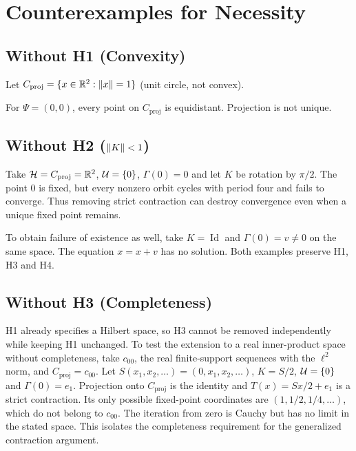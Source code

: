 ﻿%
\section{Counterexamples for Necessity}

\subsection{Without H1 (Convexity)}

Let ${C_{\mathrm{proj}}} = \{x \in \mathbb{R}^2 : \left\lVert x \right\rVert = 1\}$ (unit circle, not convex).

For $\Psi = (0, 0)$, every point on ${C_{\mathrm{proj}}}$ is equidistant. Projection is not unique.

\subsection{\texorpdfstring{Without H2 ($\left\lVert K \right\rVert < 1$)}{Without H2 (norm K < 1)}}

Take $\mathcal{H}={C_{\mathrm{proj}}}=\mathbb R^2$, $\mathcal{U}=\{0\}$, $\Gamma(0)=0$ and let $K$ be rotation by $\pi/2$. The point $0$ is fixed, but every nonzero orbit cycles with period four and fails to converge. Thus removing strict contraction can destroy convergence even when a unique fixed point remains.

To obtain failure of existence as well, take $K=\operatorname{Id}$ and $\Gamma(0)=v\neq0$ on the same space. The equation $x=x+v$ has no solution. Both examples preserve H1, H3 and H4.

\subsection{Without H3 (Completeness)}

H1 already specifies a Hilbert space, so H3 cannot be removed independently while keeping H1 unchanged. To test the extension to a real inner-product space without completeness, take $c_{00}$, the real finite-support sequences with the $\ell^2$ norm, and ${C_{\mathrm{proj}}}=c_{00}$. Let $S(x_1,x_2,\ldots)=(0,x_1,x_2,\ldots)$, $K=S/2$, $\mathcal{U}=\{0\}$ and $\Gamma(0)=e_1$. Projection onto ${C_{\mathrm{proj}}}$ is the identity and $T(x)=Sx/2+e_1$ is a strict contraction. Its only possible fixed-point coordinates are $(1,1/2,1/4,\ldots)$, which do not belong to $c_{00}$. The iteration from zero is Cauchy but has no limit in the stated space. This isolates the completeness requirement for the generalized contraction argument.

